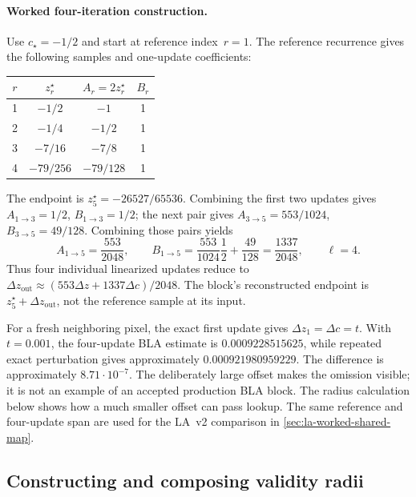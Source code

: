 \paragraph{Worked four-iteration construction.}
\label{sec:bla-v1-worked-map}
Use $c_\star=-1/2$ and start at reference index~$r=1$. The reference
recurrence gives the following samples and one-update coefficients:
\begin{center}
\begin{tabular}{cccc}
\hline
$r$ & $z_r^\star$ & $A_r=2z_r^\star$ & $B_r$\\
\hline
1 & $-1/2$ & $-1$ & 1\\
2 & $-1/4$ & $-1/2$ & 1\\
3 & $-7/16$ & $-7/8$ & 1\\
4 & $-79/256$ & $-79/128$ & 1\\
\hline
\end{tabular}
\end{center}
The endpoint is $z_5^\star=-26527/65536$. Combining the first two
updates gives $A_{1\to3}=1/2$, $B_{1\to3}=1/2$; the next pair gives
$A_{3\to5}=553/1024$, $B_{3\to5}=49/128$. Combining those pairs yields
\begin{equation}
A_{1\to5}=\frac{553}{2048},\qquad
B_{1\to5}=\frac{553}{1024}\frac12+\frac{49}{128}
         =\frac{1337}{2048},\qquad \ell=4.
\label{eq:bla-v1-worked-coefficients}
\end{equation}
Thus four individual linearized updates reduce to
$\Delta z_{\mathrm{out}}\approx(553\Delta z+1337\Delta c)/2048$.
The block's reconstructed endpoint is
$z_5^\star+\Delta z_{\mathrm{out}}$, not the reference sample at its input.

For a fresh neighboring pixel, the exact first update gives
$\Delta z_1=\Delta c=t$. With $t=0.001$, the four-update BLA estimate
is $0.0009228515625$, while repeated exact perturbation gives
approximately $0.000921980959229$. The difference is approximately
$8.71\cdot10^{-7}$. The deliberately large offset makes the omission visible;
it is not an example of an accepted production BLA block. The radius calculation
below shows how a much smaller offset can pass lookup. The same reference and
four-update span are used for the LA~v2 comparison in
\cref{sec:la-worked-shared-map}.

\subsection{Constructing and composing validity radii}
\label{sec:bla-v1-validity}

